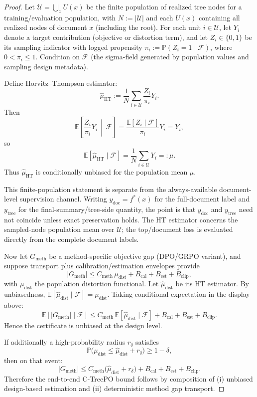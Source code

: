 \documentclass[11pt]{article}
\newcommand{\E}{\mathbb{E}}
\newcommand{\Prob}{\mathbb{P}}
\begin{document}
\begin{proof}
Let $\mathcal{U}=\bigcup_x U(x)$ be the finite population of realized tree nodes for a training/evaluation population, with $N:=|\mathcal{U}|$ and each $U(x)$ containing all realized nodes of document $x$ (including the root).
For each unit $i\in\mathcal{U}$, let $Y_i$ denote a target contribution (objective or distortion term), and let $Z_i\in\{0,1\}$ be its sampling indicator with logged propensity
$\pi_i:=\Prob(Z_i=1\mid\mathcal{F})$, where $0<\pi_i\le1$.
Condition on $\mathcal{F}$ (the sigma-field generated by population values and sampling design metadata).

Define Horvitz--Thompson estimator:
\[
\widehat{\mu}_{\mathrm{HT}}:=\frac{1}{N}\sum_{i\in\mathcal{U}}\frac{Z_i}{\pi_i}Y_i.
\]
Then
\[
\E\left[\frac{Z_i}{\pi_i}Y_i\,\middle|\,\mathcal{F}\right]
=\frac{\E[Z_i\mid\mathcal{F}]}{\pi_i}Y_i
=Y_i,
\]
so
\[
\E[\widehat{\mu}_{\mathrm{HT}}\mid\mathcal{F}]
=\frac{1}{N}\sum_{i\in\mathcal{U}}Y_i
=:\mu.
\]
Thus $\widehat{\mu}_{\mathrm{HT}}$ is conditionally unbiased for the population mean $\mu$.

This finite-population statement is separate from the always-available document-level supervision channel. Writing $y_{\mathrm{doc}}=f^\ast(x)$ for the full-document label and $y_{\mathrm{tree}}$ for the final-summary/tree-side quantity, the point is that $y_{\mathrm{doc}}$ and $y_{\mathrm{tree}}$ need not coincide unless exact preservation holds. The HT estimator concerns the sampled-node population mean over $\mathcal{U}$; the top/document loss is evaluated directly from the complete document labels.

Now let $G_{\mathrm{meth}}$ be a method-specific objective gap (DPO/GRPO variant), and suppose transport plus calibration/estimation envelopes provide
\[
|G_{\mathrm{meth}}|
\le C_{\mathrm{meth}}\,\mu_{\mathrm{dist}} + B_{\mathrm{cal}}+B_{\mathrm{est}}+B_{\mathrm{clip}},
\]
with $\mu_{\mathrm{dist}}$ the population distortion functional.
Let $\widehat{\mu}_{\mathrm{dist}}$ be its HT estimator.
By unbiasedness, $\E[\widehat{\mu}_{\mathrm{dist}}\mid\mathcal{F}]=\mu_{\mathrm{dist}}$.
Taking conditional expectation in the display above:
\[
\E[|G_{\mathrm{meth}}|\mid\mathcal{F}]
\le C_{\mathrm{meth}}\,\E[\widehat{\mu}_{\mathrm{dist}}\mid\mathcal{F}]
+B_{\mathrm{cal}}+B_{\mathrm{est}}+B_{\mathrm{clip}}.
\]
Hence the certificate is unbiased at the design level.

If additionally a high-probability radius $r_\delta$ satisfies
\[
\Prob\big(\mu_{\mathrm{dist}}\le\widehat{\mu}_{\mathrm{dist}}+r_\delta\big)\ge1-\delta,
\]
then on that event:
\[
|G_{\mathrm{meth}}|
\le C_{\mathrm{meth}}\big(\widehat{\mu}_{\mathrm{dist}}+r_\delta\big)
+B_{\mathrm{cal}}+B_{\mathrm{est}}+B_{\mathrm{clip}}.
\]
Therefore the end-to-end C-TreePO bound follows by composition of
(i) unbiased design-based estimation and
(ii) deterministic method gap transport.
\end{proof}
\end{document}
